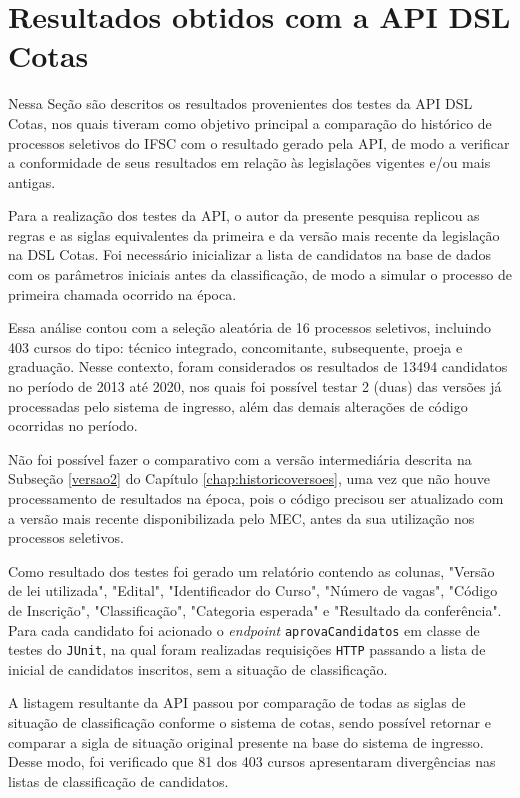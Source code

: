\section{Resultados obtidos com a API DSL Cotas}
\label{sec:avaliacaoapi}

Nessa Seção são descritos os resultados provenientes dos testes da API DSL Cotas, nos quais tiveram como objetivo principal a comparação do histórico de processos seletivos do \gls{IFSC} com o resultado gerado pela API, de modo a verificar a conformidade de seus resultados em relação às legislações vigentes e/ou mais antigas.

Para a realização dos testes da API, o autor da presente pesquisa replicou as regras e as siglas equivalentes da primeira e da versão mais recente da legislação na DSL Cotas. Foi necessário inicializar a lista de candidatos na base de dados com os parâmetros iniciais antes da classificação, de modo a simular o processo de primeira chamada ocorrido na época.

Essa análise contou com a seleção aleatória de 16 processos seletivos, incluindo 403 cursos do tipo: técnico integrado, concomitante, subsequente, proeja e graduação. Nesse contexto, foram considerados os resultados de 13494 candidatos no período de 2013 até 2020, nos quais foi possível testar 2 (duas) das versões já processadas pelo sistema de ingresso, além das demais alterações de código ocorridas no período. 

Não foi possível fazer o comparativo com a versão intermediária descrita na Subseção \ref{versao2} do Capítulo \ref{chap:historicoversoes}, uma vez que não houve processamento de resultados na época, pois o código precisou ser atualizado com a versão mais recente disponibilizada pelo MEC, antes da sua utilização nos processos seletivos.

Como resultado dos testes foi gerado um relatório contendo as colunas, "Versão de lei utilizada", "Edital", "Identificador do Curso", "Número de vagas", "Código de Inscrição", "Classificação", "Categoria esperada" e "Resultado da conferência". Para cada candidato foi acionado o \textit{endpoint} \texttt{aprovaCandidatos} em classe de testes do \texttt{JUnit}, na qual foram realizadas requisições \texttt{HTTP} passando a lista de inicial de candidatos inscritos, sem a situação de classificação.

A listagem resultante da API passou por comparação de todas as siglas de situação de classificação conforme o sistema de cotas, sendo possível retornar e comparar a sigla de situação original presente na base do sistema de ingresso. Desse modo, foi verificado que 81 dos 403 cursos apresentaram divergências nas listas de classificação de candidatos.

